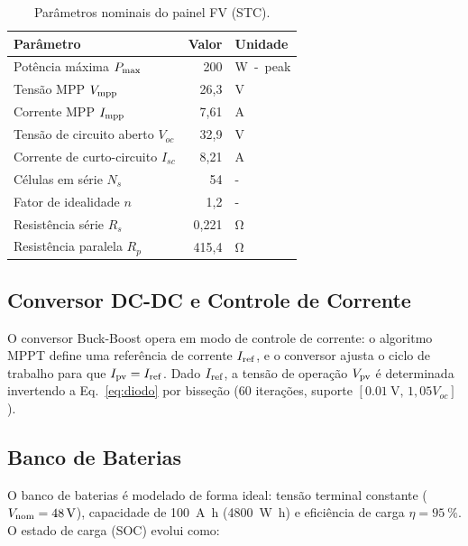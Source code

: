 \documentclass[11pt,a4paper]{article}
\begin{document}
\begin{table}[H]
  \centering
  \caption{Parâmetros nominais do painel FV (STC).}
  \label{tab:params}
  \small
  \begin{tabular}{lrl}
    \toprule
    Parâmetro & Valor & Unidade \\
    \midrule
    Potência máxima $P_{\rm max}$   & 200   & \si{\watt-peak} \\
    Tensão MPP $V_{\rm mpp}$        & 26,3  & \si{\volt}      \\
    Corrente MPP $I_{\rm mpp}$      & 7,61  & \si{\ampere}    \\
    Tensão de circuito aberto $V_{oc}$ & 32,9 & \si{\volt}   \\
    Corrente de curto-circuito $I_{sc}$ & 8,21 & \si{\ampere}\\
    Células em série $N_s$          & 54    & -               \\
    Fator de idealidade $n$         & 1,2   & -               \\
    Resistência série $R_s$         & 0,221 & \si{\ohm}       \\
    Resistência paralela $R_p$      & 415,4 & \si{\ohm}       \\
    \bottomrule
  \end{tabular}
\end{table}

\subsection{Conversor DC-DC e Controle de Corrente}

O conversor Buck-Boost opera em modo de controle de corrente: o algoritmo MPPT
define uma referência de corrente $I_{\rm ref}$, e o conversor ajusta o ciclo de
trabalho para que $I_{\rm pv} = I_{\rm ref}$. Dado $I_{\rm ref}$, a tensão de
operação $V_{\rm pv}$ é determinada invertendo a Eq.~\eqref{eq:diodo} por
bisseção (60 iterações, suporte $[\SI{0,01}{\volt},\, 1{,}05 V_{oc}]$).

\subsection{Banco de Baterias}

O banco de baterias é modelado de forma ideal: tensão terminal constante
($V_{\rm nom} = \SI{48}{\volt}$), capacidade de \SI{100}{\ampere\hour}
(\SI{4800}{\watt\hour}) e eficiência de carga $\eta = \SI{95}{\percent}$.
O estado de carga (SOC) evolui como:
\end{document}
